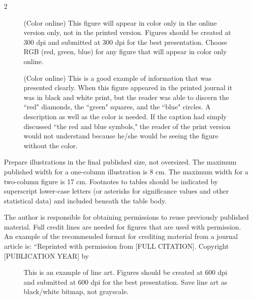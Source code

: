 \documentclass[fleqn]{2026SCGE}
\begin{document}
\begin{multicols}{2}
\begin{figure}[H]%
\centering
\caption{(Color online) This figure will appear in color only in the online version only, not in the printed version. Figures should be created at 300 dpi and submitted at 300 dpi for the best presentation. Choose RGB (red, green, blue) for any figure that will appear in color only online.} %
\label{fig:example2}%
\end{figure}


\begin{figure}[H]%
\centering
\caption{(Color online) This is a good example of information that was presented clearly. When this figure appeared in the printed journal it was in black and white print, but the reader was able to discern the ``red" diamonds, the ``green" squares, and the ``blue" circles. A description as well as the color is needed. If the caption had simply discussed ``the red and blue symbols," the reader of the print version would not understand because he/she would be seeing the figure without the color.} %
\label{fig:example3}%
\end{figure}


Prepare illustrations in the final published size, not oversized. The maximum published width for a one-column illustration is 8 cm. The maximum width for a two-column figure is 17 cm. Footnotes to tables should be indicated by superscript lower-case letters (or asterisks for significance values and other statistical data) and included beneath the table body.

The author is responsible for obtaining permissions to reuse previously published material. Full credit lines are needed for figures that are used with permission. An example of the recommended format for crediting material from  a journal article is: ``Reprinted with permission from [FULL CITATION]. Copyright [PUBLICATION YEAR] by  \linebreak \vspace{-8mm}


\begin{figure}[H]%
\centering
\caption{This is an example of line art. Figures should be created at 600 dpi and submitted at 600 dpi for the best presentation. Save line art as black/white bitmap, not grayscale.} %
\label{fig:example4}%
\end{figure}



\end{multicols}
\end{document}
